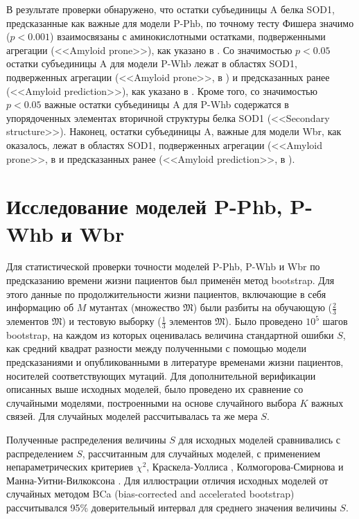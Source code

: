 В результате проверки обнаружено, что остатки субъединицы A белка SOD1, предсказанные как важные для модели P-Phb, по точному тесту Фишера значимо ($p < 0.001$) взаимосвязаны с аминокислотными остатками, подверженными агрегации (<<Amyloid prone>>), как указано в \cite{Durazo2009}. Со значимостью $p < 0.05$ остатки субъединицы A для модели P-Whb лежат в областях SOD1, подверженных агрегации (<<Amyloid prone>>, в \cite{Durazo2009}) и предсказанных ранее (<<Amyloid prediction>>), как указано в \cite{Wright2013}. Кроме того, со значимостью $p < 0.05$ важные остатки субъединицы A для P-Whb содержатся в упорядоченных элементах вторичной структуры белка SOD1 (<<Secondary structure>>). Наконец, остатки субъединицы A, важные для модели Wbr, как оказалось, лежат в областях SOD1, подверженных агрегации (<<Amyloid prone>>, в \cite{Durazo2009} и предсказанных ранее (<<Amyloid prediction>>, в \cite{Wright2013}).

\section{Исследование моделей P-Phb, P-Whb и Wbr} \label{sect_MD_analysis}

Для статистической проверки точности моделей P-Phb, P-Whb и Wbr по предсказанию времени жизни пациентов был применён метод bootstrap. Для этого данные по продолжительности жизни пациентов, включающие в себя информацию об $M$ мутантах (множество $\mathfrak{M}$) были разбиты на обучающую ($\frac{2}{3}$ элементов $\mathfrak{M}$) и тестовую выборку ($\frac{1}{3}$ элементов $\mathfrak{M}$). Было проведено $10^5$ шагов bootstrap, на каждом из которых оценивалась величина стандартной ошибки $S$, как средний квадрат разности между полученными с помощью модели предсказаниями и опубликованными в литературе временами жизни пациентов, носителей соответствующих мутаций.
Для дополнительной верификации описанных выше исходных моделей, было проведено их сравнение со случайными моделями, построенными на основе случайного выбора $K$ важных связей. Для случайных моделей рассчитывалась та же мера $S$.

Полученные распределения величины $S$ для исходных моделей сравнивались с распределением $S$, рассчитанным для случайных моделей, с применением непараметрических критериев $\chi^2$, Краскела-Уоллиса \cite{Kruskal1952}, Колмогорова-Смирнова \cite{Kolmogorov1933,Smirnov1948} и Манна-Уитни-Вилкоксона \cite{Mann1947,Wilcoxon1945}. Для иллюстрации отличия исходных моделей от случайных методом BCa (bias-corrected and accelerated bootstrap) \cite{Efron1987} рассчитывался 95\% доверительный интервал для среднего значения величины $S$.

